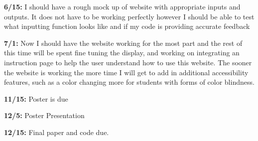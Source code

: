 \documentclass[10pt,twocolumn]{article}
\begin{document}
\textbf{6/15:}  
I should have a rough mock up of website with appropriate inputs and outputs. It does not have to be working perfectly however I should be able to test what inputting function looks like and if my code is providing accurate feedback

\textbf{7/1:}  Now I should have the website working for the most part and the rest of this time will be spent fine tuning the display, and working on integrating an instruction page to help the user understand how to use this website. The sooner the website is working the more time I will get to add in additional accessibility features, such as a color changing more for students with forms of color blindness.

\textbf{11/15:} 
Poster is due 

\textbf{12/5:} 
Poster Presentation

\textbf{12/15:} 
Final paper and code due.


\begin{comment}
No definition citations, unless the term itself is in dispute
Separate problem background from technical background
    Unclear if games and apps require much technical background
    The general structure of the framework might be better suited for the Architecture Overview section
        Eg. Flask uses decorators to associate functions with URLs
        Eg. Unity has scripts associated with objects and specific triggers, such as walking into an area, pressing a button, etc.
    Maybe a better name is "algorithmic background"?
        Should explore what does and doesn't count
            All ML counts
            App and game frameworks do not
        Framework vs. library?
            I like the idea of [inversion of control](https://martinfowler.com/bliki/InversionOfControl.html), but that may be too abstract for students to understand
        Heuristic: is understanding that system necessary to understand the results?
            Ie. How Flask or Unity works doesn't influence whether the app/game is useful/fun/engaging
            But how (say) linear regression works is highly relevant for why the results match/don't match the actual values
\end{comment}

\printbibliography 
\end{document}
